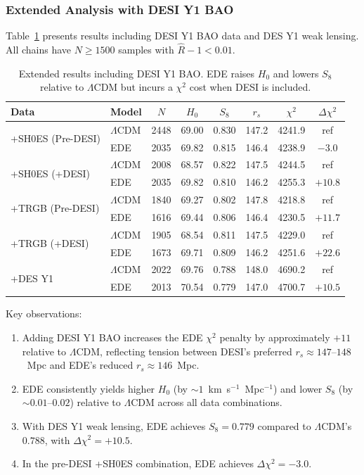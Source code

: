 \documentclass[a4paper,11pt]{article}
\begin{document}
\subsubsection{Extended Analysis with DESI Y1 BAO}

Table~\ref{tab:tier5_running} presents results including DESI Y1 BAO data and DES Y1 weak lensing. All chains have $N \geq 1500$ samples with $\hat{R} - 1 < 0.01$.

\begin{table}[h]
\centering
\caption{Extended results including DESI Y1 BAO. EDE raises $H_0$ and lowers $S_8$ relative to $\Lambda$CDM but incurs a $\chi^2$ cost when DESI is included.}
\label{tab:tier5_running}
\begin{tabular}{llcccccc}
\toprule
Data & Model & $N$ & $H_0$ & $S_8$ & $r_s$ & $\chi^2$ & $\Delta\chi^2$ \\
\midrule
\multirow{2}{*}{+SH0ES (Pre-DESI)} 
 & $\Lambda$CDM & 2448 & 69.00 & 0.830 & 147.2 & 4241.9 & ref \\
 & EDE & 2035 & 69.82 & 0.815 & 146.4 & 4238.9 & $-3.0$ \\
\midrule
\multirow{2}{*}{+SH0ES (+DESI)} 
 & $\Lambda$CDM & 2008 & 68.57 & 0.822 & 147.5 & 4244.5 & ref \\
 & EDE & 2035 & 69.82 & 0.810 & 146.2 & 4255.3 & $+10.8$ \\
\midrule
\multirow{2}{*}{+TRGB (Pre-DESI)} 
 & $\Lambda$CDM & 1840 & 69.27 & 0.802 & 147.8 & 4218.8 & ref \\
 & EDE & 1616 & 69.44 & 0.806 & 146.4 & 4230.5 & $+11.7$ \\
\midrule
\multirow{2}{*}{+TRGB (+DESI)} 
 & $\Lambda$CDM & 1905 & 68.54 & 0.811 & 147.5 & 4229.0 & ref \\
 & EDE & 1673 & 69.71 & 0.809 & 146.2 & 4251.6 & $+22.6$ \\
\midrule
\multirow{2}{*}{+DES Y1} 
 & $\Lambda$CDM & 2022 & 69.76 & 0.788 & 148.0 & 4690.2 & ref \\
 & EDE & 2013 & 70.54 & 0.779 & 147.0 & 4700.7 & $+10.5$ \\
\bottomrule
\end{tabular}
\end{table}

Key observations:
\begin{enumerate}
    \item Adding DESI Y1 BAO increases the EDE $\chi^2$ penalty by approximately $+11$ relative to $\Lambda$CDM, reflecting tension between DESI's preferred $r_s \approx 147$--$148$~Mpc and EDE's reduced $r_s \approx 146$~Mpc.
    \item EDE consistently yields higher $H_0$ (by $\sim 1$~km~s$^{-1}$~Mpc$^{-1}$) and lower $S_8$ (by $\sim 0.01$--$0.02$) relative to $\Lambda$CDM across all data combinations.
    \item With DES Y1 weak lensing, EDE achieves $S_8 = 0.779$ compared to $\Lambda$CDM's $0.788$, with $\Delta\chi^2 = +10.5$.
    \item In the pre-DESI +SH0ES combination, EDE achieves $\Delta\chi^2 = -3.0$.
\end{enumerate}
\end{document}
